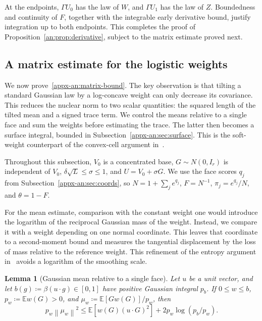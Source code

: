 \documentclass[11pt,letterpaper]{article}
\newtheorem{lemma}{Lemma}
\theoremstyle{remark}
\newcommand{\E}{\mathbb E}
\newcommand{\norm}[1]{\left\lVert#1\right\rVert}
\begin{document}
At the endpoints, \(\Gamma U_0\) has the law of \(W\), and
\(\Gamma U_1\) has the law of \(Z\). Boundedness and continuity
of \(F\), together with the integrable early derivative bound,
justify integration up to both endpoints. This completes the proof
of Proposition~\ref{an:prop:derivative}, subject to the matrix
estimate proved next.

\subsection{A matrix estimate for the logistic weights}
\label{appx-an:sec:matrix}

We now prove~\eqref{appx-an:matrix-bound}. The key observation is that
tilting a standard Gaussian law by a log-concave weight can only
decrease its covariance. This reduces the nuclear norm to two scalar
quantities: the squared length of the tilted mean and a signed trace
term. We control the means relative to a single face and sum the
weights before estimating the trace. The latter then becomes a
surface integral, bounded in Subsection~\ref{appx-an:sec:surface}.
This is the soft-weight counterpart of the convex-cell argument
in~\cite[Lemma~12]{GaoZhang}.

Throughout this subsection, \(V_0\) is a concentrated base,
\(G\sim N(0,I_r)\) is independent of \(V_0\),
\(\delta\sqrt L\le\sigma\le1\), and \(U=V_0+\sigma G\).
We use the face scores \(q_j\) from
Subsection~\ref{appx-an:sec:coords}, so
\(N=1+\sum_j e^{q_j}\), \(F=N^{-1}\),
\(\pi_j=e^{q_j}/N\), and \(\theta=1-F\).

For the mean estimate, comparison with the constant weight one would
introduce the logarithm of the reciprocal Gaussian mass of the weight.
Instead, we compare it with a weight depending on one normal coordinate.
This leaves that coordinate to a second-moment bound and measures the
tangential displacement by the loss of mass relative to the reference
weight. This refinement of the entropy argument
in~\cite[Lemma~12]{GaoZhang} avoids a logarithm of the smoothing scale.

\begin{lemma}[Gaussian mean relative to a single face]
\label{appx-an:lem:mean}
Let \(u\) be a unit vector, and let \(b(g)\coloneqq \beta(u\cdot g)\in[0,1]\) have
positive Gaussian integral \(p_b\). If \(0\le w\le b\),
\(p_w\coloneqq \E w(G)>0\), and \(\mu_w\coloneqq \E[Gw(G)]/p_w\), then
\begin{equation}
 p_w\norm{\mu_w}^2
 \le \E[w(G)(u\cdot G)^2]
        +2p_w\log(p_b/p_w).
 \label{appx-an:mean-entropy}
\end{equation}
\end{lemma}
\end{document}
